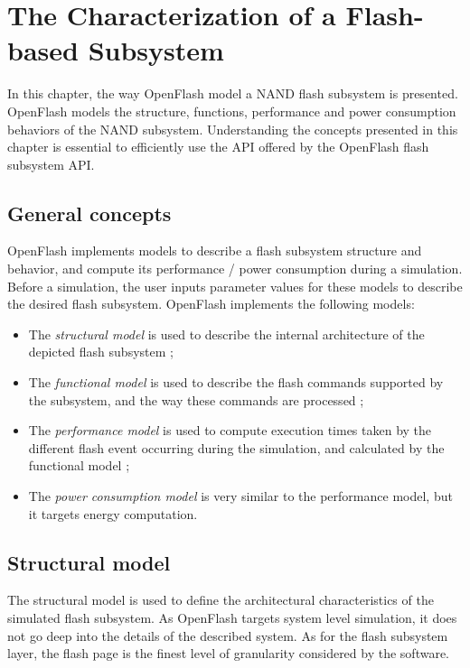 
\chapter{The Characterization of a Flash-based Subsystem}

In this chapter, the way OpenFlash model a NAND flash subsystem is presented. OpenFlash models the structure, functions, performance and power consumption behaviors of the NAND subsystem. Understanding the concepts presented in this chapter is essential to efficiently use the API offered by the OpenFlash flash subsystem API. 

\section{General concepts}

OpenFlash implements models to describe a flash subsystem structure and behavior, and compute its performance / power consumption during a simulation. Before a simulation, the user inputs parameter values for these models to describe the desired flash subsystem. OpenFlash implements the following models:
\begin{itemize}
  \item The \emph{structural model} is used to describe the internal architecture of the depicted flash subsystem ;
  \item The \emph{functional model} is used to describe the flash commands supported by the subsystem, and the way these commands are processed ;
  \item The \emph{performance model} is used to compute execution times taken by the different flash event occurring during the simulation, and calculated by the functional model ;
  \item The \emph{power consumption model} is very similar to the performance model, but it targets energy computation.
\end{itemize}

\section{Structural model}

The structural model is used to define the architectural characteristics of the simulated flash subsystem. As OpenFlash targets system level simulation, it does not go deep into the details of the described system. As for the flash subsystem layer, the flash page is the finest level of granularity considered by the software.

